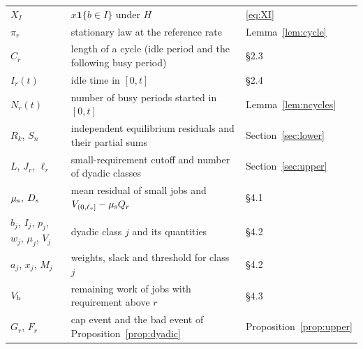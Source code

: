 \documentclass[11pt]{amsart}
\theoremstyle{remark}
\numberwithin{equation}{section}
\newcommand{\1}{\mathbf 1}
\begin{document}
\begin{tabular}{@{}p{}p{}p{}@{}}
$X_I$ & $x\1\{b\in I\}$ under $H$ & \eqref{eq:XI}\\
$\pi_r$ & stationary law at the reference rate & Lemma~\ref{lem:cycle}\\
$C_r$ & length of a cycle (idle period and the following busy period) & \S2.3\\
$I_r(t)$ & idle time in $[0,t]$ & \S2.4\\
$N_r(t)$ & number of busy periods started in $[0,t]$ & Lemma~\ref{lem:ncycles}\\
$R_k$, $S_n$ & independent equilibrium residuals and their partial sums & Section~\ref{sec:lower}\\
$L$, $J_r$, $\ell_r$ & small-requirement cutoff and number of dyadic classes & Section~\ref{sec:upper}\\
$\mu_{\rm s}$, $D_{\rm s}$ & mean residual of small jobs and $V_{(0,\ell_r]}-\mu_{\rm s}Q_r$ & \S4.1\\
$b_j$, $I_j$, $p_j$, $w_j$, $\mu_j$, $V_j$ & dyadic class $j$ and its quantities & \S4.2\\
$a_j$, $x_j$, $M_j$ & weights, slack and threshold for class $j$ & \S4.2\\
$V_{\rm b}$ & remaining work of jobs with requirement above $r$ & \S4.3\\
$G_r$, $F_r$ & cap event and the bad event of Proposition~\ref{prop:dyadic} & Proposition~\ref{prop:upper}\\
\end{tabular}
\end{document}
